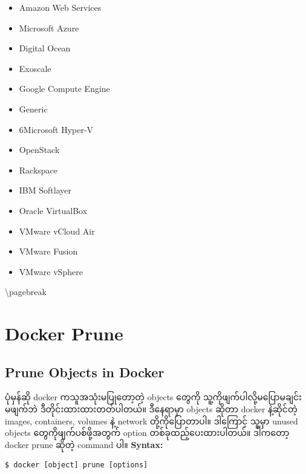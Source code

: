 \begin{itemize}
\itemsep1pt\parskip0pt
\item
  Amazon Web Services\\
\item
  Microsoft Azure\\
\item
  Digital Ocean\\
\item
  Exoscale\\
\item
  Google Compute Engine\\
\item
  Generic\\
\item
  6Microsoft Hyper-V\\
\item
  OpenStack\\
\item
  Rackspace\\
\item
  IBM Softlayer\\
\item
  Oracle VirtualBox\\
\item
  VMware vCloud Air\\
\item
  VMware Fusion\\
\item
  VMware vSphere
\end{itemize}

\textbackslash{}pagebreak

\section{Docker Prune}\label{docker-prune}

\subsection{Prune Objects in Docker}\label{prune-objects-in-docker}

ပုံမှန်ဆို docker ကသူအသုံးမပြုတော့တဲ့ objects ‌တွေကို
သူ့ကိုဖျက်ပါလို့မပြောမချင်း မဖျက်ဘဲ ဒီတိုင်းထားထားတတ်ပါတယ်။ ဒီနေရာမှာ
objects ဆိုတာ docker နဲ့ဆိုင်တဲ့ images, containers, volumes နဲ့ network
တို့ကိုပြောတာပါ။ ဒါကြောင့် သူ့မှာ unused objects တွေကိုဖျက်ပစ်ဖို့အတွက်
option တစ်ခုထည့်ပေးထားပါတယ်။ ဒါကတော့ docker prune ဆိုတဲ့ command ပါ။
\textbf{Syntax:}

\begin{verbatim}
$ docker [object] prune [options]
\end{verbatim}

